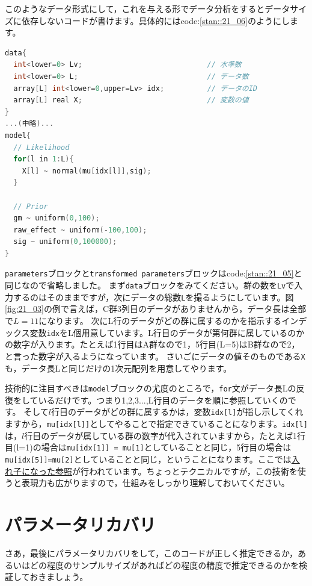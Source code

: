 \documentclass{ltjsbook}
\begin{document}
このようなデータ形式にして，これを与える形でデータ分析をするとデータサイズに依存しないコードが書けます。具体的にはcode:\ref{stan::21_06}のようにします。
\begin{lstlisting}[language=C++,label={stan::21_06},caption={整然データに対応したコード}]
data{
  int<lower=0> Lv;                             // 水準数
  int<lower=0> L;                              // データ数
  array[L] int<lower=0,upper=Lv> idx;          // データのID
  array[L] real X;                             // 変数の値
}
...(中略)...
model{
  // Likelihood
  for(l in 1:L){
    X[l] ~ normal(mu[idx[l]],sig);
  }
    
  // Prior
  gm ~ uniform(0,100);
  raw_effect ~ uniform(-100,100);
  sig ~ uniform(0,100000);
}
\end{lstlisting}

\verb|parameters|ブロックと\verb|transformed parameters|ブロックはcode:\ref{stan::21_05}と同じなので省略しました。
まず\verb|data|ブロックをみてください。群の数を\verb|Lv|で入力するのはそのままですが，次にデータの総数\verb|L|を撮るようにしています。図\ref{fig:21_03}の例で言えば，C群3列目のデータがありませんから，データ長は全部で$L=11$になります。
次にL行のデータがどの群に属するのかを指示するインデックス変数\verb|idx|をL個用意しています。L行目のデータが第何群に属しているのかの数字が入ります。たとえば1行目はA群なので1，5行目(L=5)はB群なので2，と言った数字が入るようになっています。
さいごにデータの値そのものである\verb|X|も，データ長Lと同じだけの1次元配列を用意してやります。

技術的に注目すべきは\verb|model|ブロックの尤度のところで，\verb|for|文がデータ長Lの反復をしているだけです。つまり1,2,3...,L行目のデータを順に参照していくのです。
そして$l$行目のデータがどの群に属するかは，変数\verb|idx[l]|が指し示してくれますから，\verb|mu[idx[l]]|としてやることで指定できていることになります。\verb|idx[l]|は，$l$行目のデータが属している群の数字が代入されていますから，たとえば1行目(l=1)の場合は\verb|mu[idx[1]] = mu[1]|としていることと同じ，5行目の場合は\verb|mu[idx[5]]=mu[2]|としていることと同じ，ということになります。ここでは\underline{入れ子になった参照}が行われています。ちょっとテクニカルですが，この技術を使うと表現力も広がりますので，仕組みをしっかり理解しておいてください。

\section{パラメータリカバリ}
さあ，最後にパラメータリカバリをして，このコードが正しく推定できるか，あるいはどの程度のサンプルサイズがあればどの程度の精度で推定できるのかを検証しておきましょう。
\end{document}
